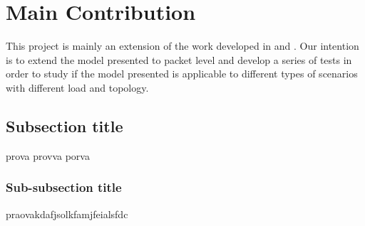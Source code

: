 \section{Main Contribution} \label{sec:contribution}
This project is mainly an extension of the work developed in \cite{gfpp1} and \cite{lgfp1}. Our intention is to extend the model presented to packet level and develop a series of tests in order to study if the model presented is applicable to different types of scenarios with different load and topology. 

\subsection{Subsection title} \label{subsec:subsection}
prova provva porva

\subsubsection{Sub-subsection title} \label{subsubsec:sub-subsection}
praovakdafjsolkfamjfeialsfdc